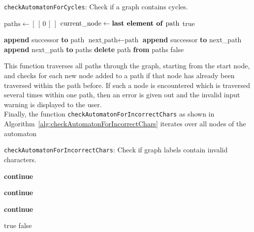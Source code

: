 \documentclass[a4paper,12pt,twoside,BCOR=10mm]{scrbook}
\begin{document}
\begin{algorithm}
\caption[\texttt{checkAutomatonForCycles}: Check if graph contains cycles]{\texttt{checkAutomatonForCycles}: Check if a graph contains cycles.}
\label{alg:checkAutomatonForCycles}
\begin{algorithmic}[1]
\State $ \textrm{paths} \gets [ \, [ \, 0 \, ] \, ] $
		\State $ \textrm{current\_node} \gets \textrm{\textbf{last element of} path} $
					\State \Return true
				\EndIf

					\State \textbf{append} successor \textbf{to} path
				\Else
					\State $ \textrm{next\_path} \gets \textrm{path} $
					\State \textbf{append} successor \textbf{to} next\_path
					\State \textbf{append} next\_path \textbf{to} paths
				\EndIf
			\EndFor
		\Else
			\State \textbf{delete} path \textbf{from} paths
		\EndIf
	\EndFor
\EndWhile
\State \Return false
\end{algorithmic}
\end{algorithm}
This function traverses all paths through the graph, starting from the start node,
and checks for each new node added to a path if that node has already been traversed within the path before.
If such a node is encountered which is traversed several times within one path, then an
error is given out and the invalid input warning is displayed to the user. \\
Finally, the function \texttt{checkAutomatonForIncorrectChars} as shown in
Algorithm~\ref{alg:checkAutomatonForIncorrectChars} iterates over all nodes of the automaton
\begin{algorithm}
\caption[\texttt{checkAutomatonForIncorrectChars}: Check if graph labels are invalid]{\texttt{checkAutomatonForIncorrectChars}: Check if graph labels contain invalid characters.}
\label{alg:checkAutomatonForIncorrectChars}
\begin{algorithmic}[1]
		\State \textbf{continue}
	\EndIf

		\State \textbf{continue}
	\EndIf

		\State \textbf{continue}
	\EndIf

	\State \Return true
\EndFor
\State \Return false
\end{algorithmic}
\end{algorithm}
\end{document}
